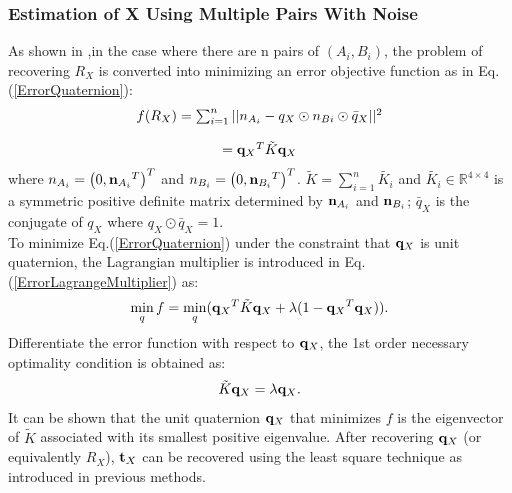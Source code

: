 \documentclass[twocolumn,10pt]{asme2ej}
\newcommand{\nn}{{\bf n}}
\newcommand{\ttt}{{\bf t}}
\newcommand{\qq}{{\bf q}}
\begin{document}
\subsubsection{Estimation of X Using Multiple Pairs With Noise}
As shown in \cite{horaud1995hand} ,in the case where there are n pairs of $(A_{i}, B_{i})$, the problem of recovering $R_{X}$ is converted into minimizing an error objective function as in Eq.(\ref{ErrorQuaternion}):
\begin{equation}
\begin{array}{c}
f(R_{X})
= \sum_{i = 1}^{n}||{n_{A_{i}} - q_{X} \odot n_{B{i}} \odot \bar{q}_{X}}||^{2} \\
\\ 
= {\qq_{X}}^{T}\tilde{K}{\qq_{X}}
\end{array}
\label{ErrorQuaternion} 
\end{equation}
where $n_{A_{i}} = \left(0, {\nn_{A_{i}}}^{T}\right)^{T}$ and $n_{B_{i}} = \left(0, {\nn_{B_{i}}}^{T}\right)^{T}$. $\tilde{K} = \sum_{i = 1}^{n}\tilde{K_{i}}$ and $\tilde{K_{i}} \in \mathbb{R}^{4 \times 4}$ is a symmetric positive definite matrix determined by $\nn_{A_{i}}$ and $\nn_{B_{i}}$; $\bar{q}_{X}$ is the conjugate of ${q}_{X}$ where $q_{X} \odot \bar{q}_{X} = 1$.\\
To minimize  Eq.(\ref{ErrorQuaternion}) under the constraint that $\qq_{X}$ is unit quaternion, the Lagrangian multiplier is introduced in Eq.(\ref{ErrorLagrangeMultiplier}) as:
\begin{equation}
\min_{q} f = \min_{q}({\qq_{X}}^{T}\tilde{K}{\qq_{X}} + \lambda(1 - {\qq_{X}}^{T}{\qq_{X}})).
\label{ErrorLagrangeMultiplier}
\end{equation}
Differentiate the error function with respect to $\qq_{X}$, the 1st order necessary optimality condition is obtained as: 
\begin{equation}
\tilde{K}\qq_{X} = \lambda \qq_{X}.
\label{QuaternionEig}
\end{equation}
It can be shown that the unit quaternion $\qq_{X}$ that minimizes $f$ is the eigenvector of $\tilde{K}$ associated with its smallest positive eigenvalue. After recovering $\qq_{X}$ (or equivalently $R_{X}$), $\ttt_{X}$ can be recovered using the least square technique as introduced in previous methods.
\end{document}
